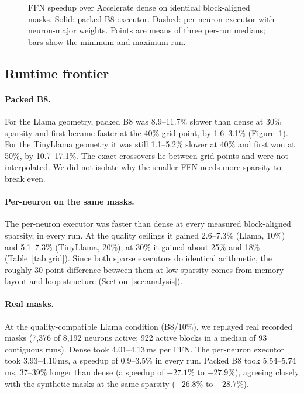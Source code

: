 \begin{figure}[t]
\centering

\caption{FFN speedup over Accelerate dense on identical block-aligned masks.
Solid: packed B8 executor. Dashed: per-neuron executor with neuron-major
weights. Points are means of three per-run medians; bars show the minimum and
maximum run.}
\label{fig:speed}
\end{figure}

\subsection{Runtime frontier}
\label{sec:runtime}

\paragraph{Packed B8.} For the Llama geometry, packed B8 was 8.9--11.7\%
slower than dense at 30\% sparsity and first became faster at the 40\% grid
point, by 1.6--3.1\% (Figure~\ref{fig:speed}). For the TinyLlama geometry it
was still 1.1--5.2\% slower at 40\% and first won at 50\%, by 10.7--17.1\%.
The exact crossovers lie between grid points and were not interpolated. We did
not isolate why the smaller FFN needs more sparsity to break even.

\paragraph{Per-neuron on the same masks.} The per-neuron executor was faster
than dense at every measured block-aligned sparsity, in every run. At the
quality ceilings it gained 2.6--7.3\% (Llama, 10\%) and 5.1--7.3\% (TinyLlama,
20\%); at 30\% it gained about 25\% and 18\% (Table~\ref{tab:grid}). Since
both sparse executors do identical arithmetic, the roughly 30-point difference
between them at low sparsity comes from memory layout and loop structure
(Section~\ref{sec:analysis}).

\paragraph{Real masks.} At the quality-compatible Llama condition (B8/10\%),
we replayed real recorded masks (7,376 of 8,192 neurons active; 922 active
blocks in a median of 93 contiguous runs). Dense took 4.01--4.13\,ms per FFN.
The per-neuron executor took 3.93--4.10\,ms, a speedup of 0.9--3.5\% in every
run. Packed B8 took 5.54--5.74\,ms, 37--39\% longer than dense (a speedup of
$-27.1\%$ to $-27.9\%$), agreeing closely with the synthetic masks at the same
sparsity ($-26.8\%$ to $-28.7\%$).

